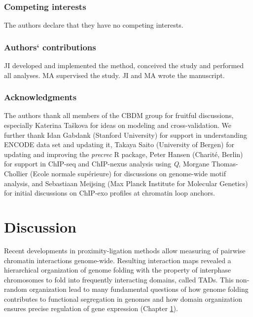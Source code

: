 \documentclass[a4paper,twoside=true,openright,parskip=full,chapterprefix=true,11pt,headings=normal,bibliography=totoc,listof=totoc,titlepage=on,captions=tableabove,draft=false]{scrreprt}
\theoremstyle{definition}
\theoremstyle{definition}
\theoremstyle{definition}
\theoremstyle{remark}
\begin{document}
\hypertarget{competing-interests-1}{%
\subsection*{Competing interests}\label{competing-interests-1}}

The authors declare that they have no competing interests.

\hypertarget{authors-contributions-1}{%
\subsection*{Authors` contributions}\label{authors-contributions-1}}

JI developed and implemented the method, conceived the study and
performed all analyses. MA supervised the study. JI and MA wrote the
manuscript.

\hypertarget{acknowledgments-1}{%
\subsection*{Acknowledgments}\label{acknowledgments-1}}

The authors thank all members of the CBDM group for fruitful
discussions, especially Katerina Taškova for ideas on modeling and
cross-validation. We further thank Idan Gabdank (Stanford University)
for support in understanding ENCODE data set and updating it, Takaya
Saito (University of Bergen) for updating and improving the
\emph{precrec} R package, Peter Hansen (Charité, Berlin) for support in
ChIP-seq and ChIP-nexus analysis using \emph{Q}, Morgane Thomas-Chollier
(Ecole normale supérieure) for discussions on genome-wide motif
analysis, and Sebastiaan Meijsing (Max Planck Institute for Molecular
Genetics) for initial discussions on ChIP-exo profiles at chromatin loop
anchors.

\hypertarget{thesis-discussion}{%
\chapter{Discussion}\label{thesis-discussion}}

Recent developments in proximity-ligation methods allow measuring of
pairwise chromatin interactions genome-wide. Resulting interaction maps
revealed a hierarchical organization of genome folding with the property
of interphase chromosomes to fold into frequently interacting domains,
called TADs. This non-random organization lead to many fundamental
questions of how genome folding contributes to functional segregation in
genomes and how domain organization ensures precise regulation of gene
expression (Chapter \protect\hyperlink{intro}{1}).
\end{document}
